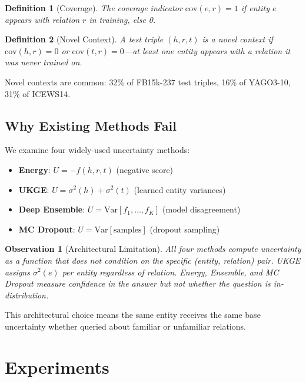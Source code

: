 \documentclass{article}
\newtheorem{definition}{Definition}
\newtheorem{observation}{Observation}
\begin{document}
\begin{definition}[Coverage]
The coverage indicator $\text{cov}(e, r) = 1$ if entity $e$ appears with relation $r$ in training, else 0.
\end{definition}

\begin{definition}[Novel Context]
A test triple $(h, r, t)$ is a \emph{novel context} if $\text{cov}(h, r) = 0$ or $\text{cov}(t, r) = 0$---at least one entity appears with a relation it was never trained on.
\end{definition}

Novel contexts are common: 32\% of FB15k-237 test triples, 16\% of YAGO3-10, 31\% of ICEWS14.

\subsection{Why Existing Methods Fail}
\label{sec:analysis}

We examine four widely-used uncertainty methods:
\begin{itemize}
    \item \textbf{Energy}: $U = -f(h, r, t)$ (negative score)
    \item \textbf{UKGE}: $U = \sigma^2(h) + \sigma^2(t)$ (learned entity variances)
    \item \textbf{Deep Ensemble}: $U = \text{Var}[f_1, \ldots, f_K]$ (model disagreement)
    \item \textbf{MC Dropout}: $U = \text{Var}[\text{samples}]$ (dropout sampling)
\end{itemize}

\begin{observation}[Architectural Limitation]
All four methods compute uncertainty as a function that does not condition on the specific (entity, relation) pair. UKGE assigns $\sigma^2(e)$ per entity regardless of relation. Energy, Ensemble, and MC Dropout measure confidence in the \emph{answer} but not whether the \emph{question} is in-distribution.
\end{observation}

This architectural choice means the same entity receives the same base uncertainty whether queried about familiar or unfamiliar relations.

\section{Experiments}
\label{sec:experiments}
\end{document}
